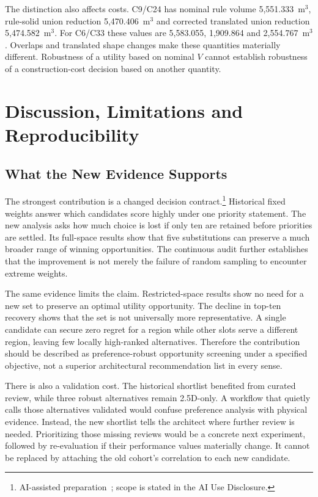 \documentclass{llncs}
\newcommand{\aidraft}{\footnote{AI-assisted preparation~\cite{openai2026}; scope is stated in the AI Use Disclosure.}}
\begin{document}
The distinction also affects costs. C9/C24 has nominal rule volume 5,551.333~m$^3$, rule-solid union reduction 5,470.406~m$^3$ and corrected translated union reduction 5,474.582~m$^3$. For C6/C33 these values are 5,583.055, 1,909.864 and 2,554.767~m$^3$. Overlaps and translated shape changes make these quantities materially different. Robustness of a utility based on nominal $V$ cannot establish robustness of a construction-cost decision based on another quantity.

\section{Discussion, Limitations and Reproducibility}
\subsection{What the New Evidence Supports}
The strongest contribution is a changed decision contract.\aidraft{} Historical fixed weights answer which candidates score highly under one priority statement. The new analysis asks how much choice is lost if only ten are retained before priorities are settled. Its full-space results show that five substitutions can preserve a much broader range of winning opportunities. The continuous audit further establishes that the improvement is not merely the failure of random sampling to encounter extreme weights.

The same evidence limits the claim. Restricted-space results show no need for a new set to preserve an optimal utility opportunity. The decline in top-ten recovery shows that the set is not universally more representative. A single candidate can secure zero regret for a region while other slots serve a different region, leaving few locally high-ranked alternatives. Therefore the contribution should be described as preference-robust opportunity screening under a specified objective, not a superior architectural recommendation list in every sense.

There is also a validation cost. The historical shortlist benefited from curated review, while three robust alternatives remain 2.5D-only. A workflow that quietly calls those alternatives validated would confuse preference analysis with physical evidence. Instead, the new shortlist tells the architect where further review is needed. Prioritizing those missing reviews would be a concrete next experiment, followed by re-evaluation if their performance values materially change. It cannot be replaced by attaching the old cohort's correlation to each new candidate.
\end{document}
